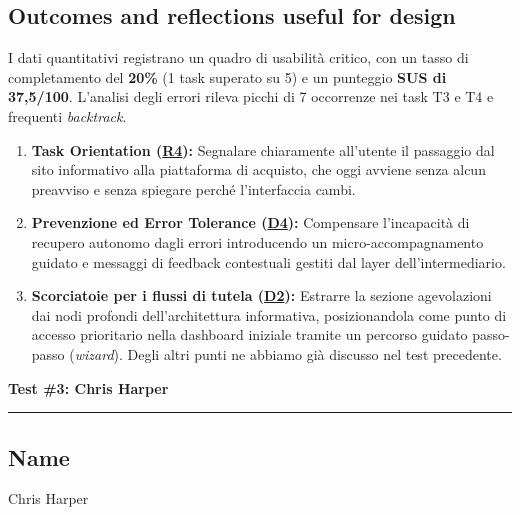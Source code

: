 \documentclass[11pt,a4paper]{article}
\begin{document}
\subsection*{Outcomes and reflections useful for design}
\begin{tcolorbox}[colback=backgroundColor,colframe=borderColor,arc=2mm]
I dati quantitativi registrano un quadro di usabilità critico, con un tasso di completamento del \textbf{20\%} (1 task superato su 5) e un punteggio \textbf{SUS di 37,5/100}. L'analisi degli errori rileva picchi di 7 occorrenze nei task T3 e T4 e frequenti \textit{backtrack}.

\medskip
\begin{enumerate}[leftmargin=*]
    \item \textbf{Task Orientation (\hyperref[iss:R4]{R4}):} Segnalare chiaramente all'utente il passaggio dal sito informativo alla piattaforma di acquisto, che oggi avviene senza alcun preavviso e senza spiegare perché l'interfaccia cambi.
    \item \textbf{Prevenzione ed Error Tolerance (\hyperref[iss:D4]{D4}):} Compensare l'incapacità di recupero autonomo dagli errori introducendo un micro-accompagnamento guidato e messaggi di feedback contestuali gestiti dal layer dell'intermediario.
    \item     \textbf{Scorciatoie per i flussi di tutela (\hyperref[iss:D2]{D2}):} Estrarre la sezione agevolazioni dai nodi profondi dell'architettura informativa, posizionandola come punto di accesso prioritario nella dashboard iniziale tramite un percorso guidato passo-passo (\textit{wizard}).
    Degli altri punti ne abbiamo già discusso nel test precedente.
\end{enumerate}
\end{tcolorbox}


\newpage
\begin{center}
  {\color{primaryColor}\large\bfseries Test \#3: Chris Harper}\\
  \vspace{0.1cm}
  \color{borderColor}\hrule
\end{center}

\vspace{0.5cm}

\subsection*{Name \normalfont\small\itshape}
\begin{tcolorbox}[colback=backgroundColor,colframe=borderColor,arc=2mm]
Chris Harper
\end{tcolorbox}
\end{document}
